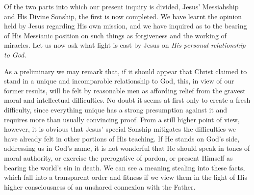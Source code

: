\documentclass[12pt,a5paper,oneside]{book}
\begin{document}
Of the two parts into which our present
inquiry is divided, Jesus' Messiahship and His
Divine Sonship, the first is now completed.
We have learnt the opinion held by Jesus regarding 
His own mission, and we have inquired as
to the bearing of His Messianic position on such
things as forgiveness and the working of miracles.
Let us now ask what light is cast by Jesus on
\textit{His personal relationship to God.}

As a preliminary we may remark that, if it
should appear that Christ claimed to stand in
a unique and incomparable relationship to God,
this, in view of our former results, will be felt
by reasonable men as affording relief from the
gravest moral and intellectual difficulties. No
doubt it seems at first only to create a fresh
difficulty, since everything unique has a strong
presumption against it and requires more than
usually convincing proof. From a still higher
point of view, however, it is obvious that Jesus'
special Sonship mitigates the difficulties we have
already felt in other portions of His teaching.
If He stands on God's side, addressing us in
God's name, it is not wonderful that He should
speak in tones of moral authority, or exercise
the prerogative of pardon, or present Himself as
bearing the world's sin in death. We can see
a meaning stealing into these facts, which fall
into a transparent order and fitness if we view
them in the light of His higher consciousness
of an unshared connexion with the Father.
\end{document}
